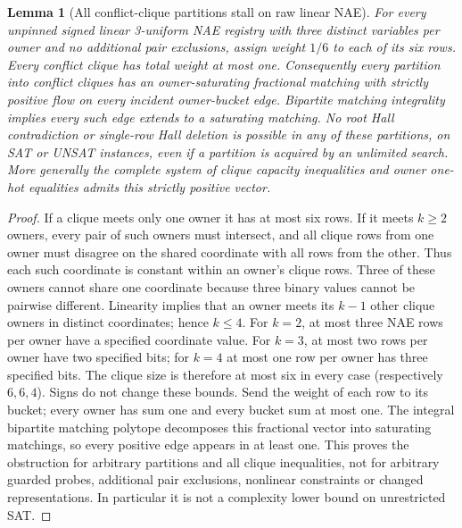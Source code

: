 \documentclass[11pt]{article}
\newtheorem{lemma}[theorem]{Lemma}
\begin{document}
\begin{lemma}[All conflict-clique partitions stall on raw linear NAE]\label{lem:m25-barrier}
For every unpinned signed linear 3-uniform NAE registry with three distinct variables per owner and no additional pair exclusions, assign weight $1/6$ to each of its six rows. Every conflict clique has total weight at most one. Consequently every partition into conflict cliques has an owner-saturating fractional matching with strictly positive flow on every incident owner-bucket edge. Bipartite matching integrality implies every such edge extends to a saturating matching. No root Hall contradiction or single-row Hall deletion is possible in any of these partitions, on SAT or UNSAT instances, even if a partition is acquired by an unlimited search. More generally the complete system of clique capacity inequalities and owner one-hot equalities admits this strictly positive vector.
\end{lemma}
\begin{proof}
If a clique meets only one owner it has at most six rows. If it meets $k\ge2$ owners, every pair of such owners must intersect, and all clique rows from one owner must disagree on the shared coordinate with all rows from the other. Thus each such coordinate is constant within an owner's clique rows. Three of these owners cannot share one coordinate because three binary values cannot be pairwise different. Linearity implies that an owner meets its $k-1$ other clique owners in distinct coordinates; hence $k\le4$. For $k=2$, at most three NAE rows per owner have a specified coordinate value. For $k=3$, at most two rows per owner have two specified bits; for $k=4$ at most one row per owner has three specified bits. The clique size is therefore at most six in every case (respectively $6,6,4$). Signs do not change these bounds. Send the weight of each row to its bucket; every owner has sum one and every bucket sum at most one. The integral bipartite matching polytope decomposes this fractional vector into saturating matchings, so every positive edge appears in at least one. This proves the obstruction for arbitrary partitions and all clique inequalities, not for arbitrary guarded probes, additional pair exclusions, nonlinear constraints or changed representations. In particular it is not a complexity lower bound on unrestricted SAT.
\end{proof}
\end{document}

